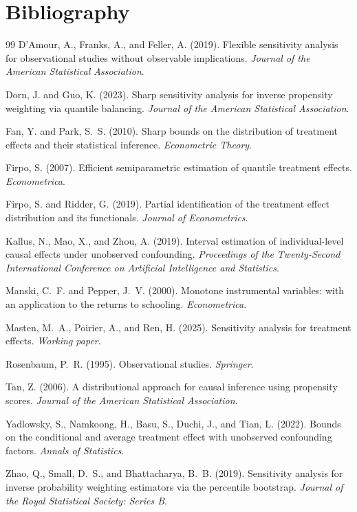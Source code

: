 \documentclass[11pt]{article}
\theoremstyle{definition}
\theoremstyle{plain}
\theoremstyle{remark}
\begin{document}
\section*{Bibliography}
\begin{thebibliography}{99}
D'Amour, A., Franks, A., and Feller, A. (2019).
Flexible sensitivity analysis for observational studies without observable implications.
\emph{Journal of the American Statistical Association}.

Dorn, J. and Guo, K. (2023).
Sharp sensitivity analysis for inverse propensity weighting via quantile balancing.
\emph{Journal of the American Statistical Association}.

Fan, Y. and Park, S.~S. (2010).
Sharp bounds on the distribution of treatment effects and their statistical inference.
\emph{Econometric Theory}.

Firpo, S. (2007).
Efficient semiparametric estimation of quantile treatment effects.
\emph{Econometrica}.

Firpo, S. and Ridder, G. (2019).
Partial identification of the treatment effect distribution and its functionals.
\emph{Journal of Econometrics}.

Kallus, N., Mao, X., and Zhou, A. (2019).
Interval estimation of individual-level causal effects under unobserved confounding.
\emph{Proceedings of the Twenty-Second International Conference on Artificial Intelligence and Statistics}.

Manski, C.~F. and Pepper, J.~V. (2000).
Monotone instrumental variables: with an application to the returns to schooling.
\emph{Econometrica}.

Masten, M.~A., Poirier, A., and Ren, H. (2025).
Sensitivity analysis for treatment effects.
\emph{Working paper}.

Rosenbaum, P.~R. (1995).
Observational studies.
\emph{Springer}.

Tan, Z. (2006).
A distributional approach for causal inference using propensity scores.
\emph{Journal of the American Statistical Association}.

Yadlowsky, S., Namkoong, H., Basu, S., Duchi, J., and Tian, L. (2022).
Bounds on the conditional and average treatment effect with unobserved confounding factors.
\emph{Annals of Statistics}.

Zhao, Q., Small, D.~S., and Bhattacharya, B.~B. (2019).
Sensitivity analysis for inverse probability weighting estimators via the percentile bootstrap.
\emph{Journal of the Royal Statistical Society: Series B}.
\end{thebibliography}
\end{document}
